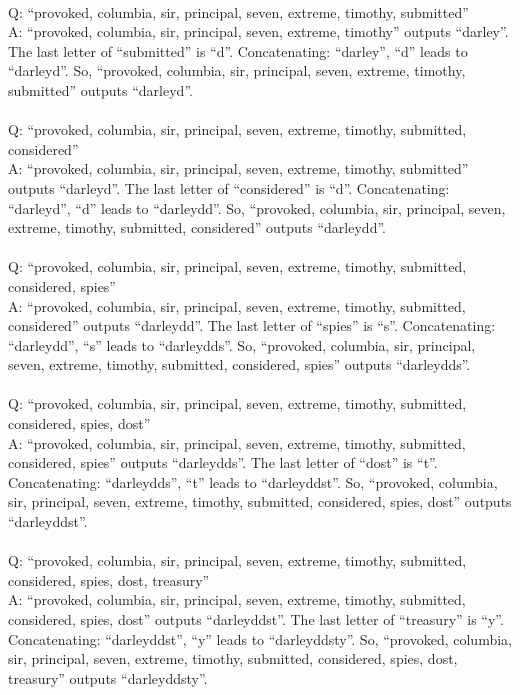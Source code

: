 {\\
Q: ``provoked, columbia, sir, principal, seven, extreme, timothy, submitted'' \\
A: ``provoked, columbia, sir, principal, seven, extreme, timothy'' outputs ``darley''. The last letter of ``submitted'' is ``d''. Concatenating: ``darley'', ``d'' leads to ``darleyd''. So, ``provoked, columbia, sir, principal, seven, extreme, timothy, submitted'' outputs ``darleyd''. \\
\\
Q: ``provoked, columbia, sir, principal, seven, extreme, timothy, submitted, considered'' \\
A: ``provoked, columbia, sir, principal, seven, extreme, timothy, submitted'' outputs ``darleyd''. The last letter of ``considered'' is ``d''. Concatenating: ``darleyd'', ``d'' leads to ``darleydd''. So, ``provoked, columbia, sir, principal, seven, extreme, timothy, submitted, considered'' outputs ``darleydd''. \\
\\
Q: ``provoked, columbia, sir, principal, seven, extreme, timothy, submitted, considered, spies'' \\
A: ``provoked, columbia, sir, principal, seven, extreme, timothy, submitted, considered'' outputs ``darleydd''. The last letter of ``spies'' is ``s''. Concatenating: ``darleydd'', ``s'' leads to ``darleydds''. So, ``provoked, columbia, sir, principal, seven, extreme, timothy, submitted, considered, spies'' outputs ``darleydds''. \\
\\
Q: ``provoked, columbia, sir, principal, seven, extreme, timothy, submitted, considered, spies, dost'' \\
A: ``provoked, columbia, sir, principal, seven, extreme, timothy, submitted, considered, spies'' outputs ``darleydds''. The last letter of ``dost'' is ``t''. Concatenating: ``darleydds'', ``t'' leads to ``darleyddst''. So, ``provoked, columbia, sir, principal, seven, extreme, timothy, submitted, considered, spies, dost'' outputs ``darleyddst''. \\
\\
Q: ``provoked, columbia, sir, principal, seven, extreme, timothy, submitted, considered, spies, dost, treasury'' \\
A: ``provoked, columbia, sir, principal, seven, extreme, timothy, submitted, considered, spies, dost'' outputs ``darleyddst''. The last letter of ``treasury'' is ``y''. Concatenating: ``darleyddst'', ``y'' leads to ``darleyddsty''. So, ``provoked, columbia, sir, principal, seven, extreme, timothy, submitted, considered, spies, dost, treasury'' outputs ``darleyddsty''. \\
}
